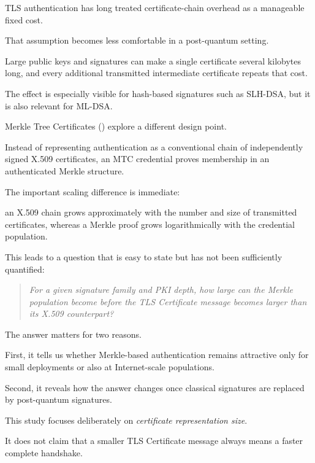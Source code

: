 \documentclass[journal]{IEEEtran}
\begin{document}
TLS authentication has long treated certificate-chain overhead as a manageable fixed cost.

That assumption becomes less comfortable in a post-quantum setting.

Large public keys and signatures can make a single certificate several kilobytes long, and every additional transmitted intermediate certificate repeats that cost.

The effect is especially visible for hash-based signatures such as SLH-DSA, but it is also relevant for ML-DSA.



Merkle Tree Certificates (\mtc) explore a different design point.

Instead of representing authentication as a conventional chain of independently signed X.509 certificates, an MTC credential proves membership in an authenticated Merkle structure.

The important scaling difference is immediate:

an X.509 chain grows approximately with the number and size of transmitted certificates, whereas a Merkle proof grows logarithmically with the credential population.



This leads to a question that is easy to state but has not been sufficiently quantified:



\begin{quote}

\emph{For a given signature family and PKI depth, how large can the Merkle population become before the TLS Certificate message becomes larger than its X.509 counterpart?}

\end{quote}



The answer matters for two reasons.

First, it tells us whether Merkle-based authentication remains attractive only for small deployments or also at Internet-scale populations.

Second, it reveals how the answer changes once classical signatures are replaced by post-quantum signatures.



This study focuses deliberately on \emph{certificate representation size}.

It does not claim that a smaller TLS Certificate message always means a faster complete handshake.
\end{document}
